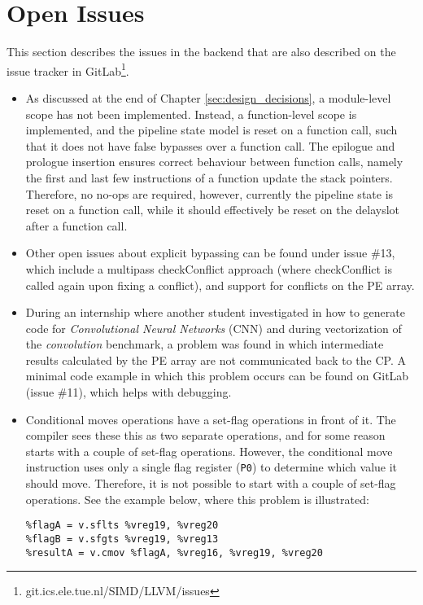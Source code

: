 \section{Open Issues}\label{sec:issues}
This section describes the issues in the backend that are also described on the issue tracker in GitLab\footnote{git.ics.ele.tue.nl/SIMD/LLVM/issues}.

\begin{itemize}
    \item As discussed at the end of Chapter \ref{sec:design_decisions}, a module-level scope has not been implemented. Instead, a function-level scope is implemented, and the pipeline state model is reset on a function call, such that it does not have false bypasses over a function call. The epilogue and prologue insertion ensures correct behaviour between function calls, namely the first and last few instructions of a function update the stack pointers. Therefore, no no-ops are required, however, currently the pipeline state is reset on a function call, while it should effectively be reset on the delayslot after a function call.
    \item Other open issues about explicit bypassing can be found under issue \#13, which include a multipass checkConflict approach (where checkConflict is called again upon fixing a conflict), and support for conflicts on the PE array.
    \item During an internship where another student investigated in how to generate code for \emph{Convolutional Neural Networks} (CNN) \cite{jiachi} and during vectorization of the \emph{convolution} benchmark, a problem was found in which intermediate results calculated by the PE array are not communicated back to the CP. A minimal code example in which this problem occurs can be found on GitLab (issue \#11), which helps with debugging.
    \item Conditional moves operations have a set-flag operations in front of it. The compiler sees these this as two separate operations, and for some reason starts with a couple of set-flag operations. However, the conditional move instruction uses only a single flag register (\texttt{P0}) to determine which value it should move. Therefore, it is not possible to start with a couple of set-flag operations. See the example below, where this problem is illustrated:
\lstset{style=customasm}
\begin{lstlisting}
%flagA = v.sflts %vreg19, %vreg20
%flagB = v.sfgts %vreg19, %vreg13
%resultA = v.cmov %flagA, %vreg16, %vreg19, %vreg20

\end{lstlisting}
\end{itemize}
